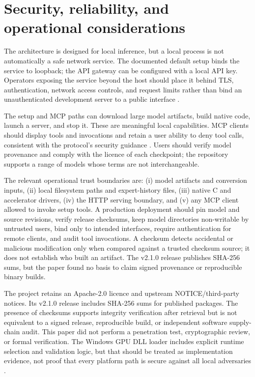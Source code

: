 \documentclass[10pt,twocolumn]{article}
\begin{document}
\section{Security, reliability, and operational considerations}
The architecture is designed for local inference, but a local process is not automatically a safe network service. The documented default setup binds the service to loopback; the API gateway can be configured with a local API key. Operators exposing the service beyond the host should place it behind TLS, authentication, network access controls, and request limits rather than bind an unauthenticated development server to a public interface \cite{qoralisapi,qoralisquickstart}.

The setup and MCP paths can download large model artifacts, build native code, launch a server, and stop it. These are meaningful local capabilities. MCP clients should display tools and invocations and retain a user ability to deny tool calls, consistent with the protocol's security guidance \cite{mcpspec,mcpsecurity}. Users should verify model provenance and comply with the licence of each checkpoint; the repository supports a range of models whose terms are not interchangeable.


The relevant operational trust boundaries are: (i) model artifacts and conversion inputs, (ii) local filesystem paths and expert-history files, (iii) native C and accelerator drivers, (iv) the HTTP serving boundary, and (v) any MCP client allowed to invoke setup tools. A production deployment should pin model and source revisions, verify release checksums, keep model directories non-writable by untrusted users, bind only to intended interfaces, require authentication for remote clients, and audit tool invocations. A checksum detects accidental or malicious modification only when compared against a trusted checksum source; it does not establish who built an artifact. The v2.1.0 release publishes SHA-256 sums, but the paper found no basis to claim signed provenance or reproducible binary builds.

The project retains an Apache-2.0 licence and upstream NOTICE/third-party notices. Its v2.1.0 release includes SHA-256 sums for published packages. The presence of checksums supports integrity verification after retrieval but is not equivalent to a signed release, reproducible build, or independent software supply-chain audit. This paper did not perform a penetration test, cryptographic review, or formal verification. The Windows GPU DLL loader includes explicit runtime selection and validation logic, but that should be treated as implementation evidence, not proof that every platform path is secure against all local adversaries \cite{upstreamnotice,qoralisrelease,qoralisbackendloader}.
\end{document}
